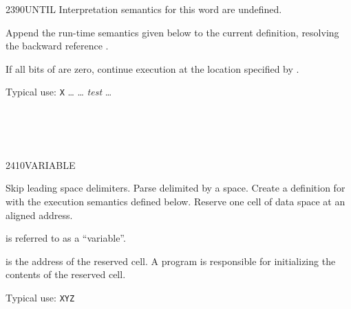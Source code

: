 \begin{worddef}{2390}{UNTIL}
\interpret
	Interpretation semantics for this word are undefined.

\compile

	Append the run-time semantics given below to the current
	definition, resolving the backward reference .

\runtime

	If all bits of  are zero, continue execution at the
	location specified by .


	\begin{rationale} %
		Typical use:
			\word{:} \texttt{X} {\ldots}
				 {\ldots} \emph{test} 
				{\ldots} \word{;}
	\end{rationale}

	\begin{testing} %
		 \\
		 \\
		 \\
	\end{testing}
\end{worddef}


\begin{worddef}{2410}{VARIABLE}
\item {}

	Skip leading space delimiters. Parse  delimited by
	a space. Create a definition for  with the execution
	semantics defined below. Reserve one cell of data space at an
	aligned address.

	 is referred to as a ``variable''.

\execute[name]

	 is the address of the reserved cell. A program
	is responsible for initializing the contents of the reserved
	cell.


	\begin{rationale} %
		Typical use:
			 \texttt{XYZ}
	\end{rationale}

	\begin{testing} %
		 \\
		 \\
	\end{testing}
\end{worddef}


